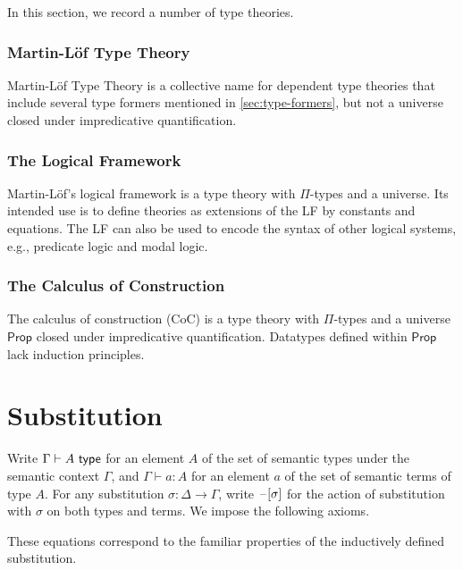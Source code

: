 \documentclass{amsart}
\begin{document}
In this section, we record a number of type theories.

\subsubsection{Martin-L\"{o}f Type Theory}
\label{sec:martin-lof-type-theory}

Martin-L\"{o}f Type Theory is a collective name for dependent type theories that include several type formers mentioned in \cref{sec:type-formers}, but not a universe closed under impredicative quantification.

\subsubsection{The Logical Framework}
\label{sec:logical-framework}

Martin-L\"{o}f's logical framework is a type theory with $\Pi$-types and a universe.
Its intended use is to define theories as extensions of the LF by constants and equations.
The LF can also be used to encode the syntax of other logical systems, e.g., predicate logic and modal logic.

\subsubsection{The Calculus of Construction}
\label{sec:calculus-of-construction}

The calculus of construction (CoC) is a type theory with $\Pi$-types and a universe $\mathsf{Prop}$ closed under impredicative quantification.
Datatypes defined within $\mathsf{Prop}$ lack induction principles.

\section{Substitution}
\label{sec:substitution}
Write $\Gamma \vdash A ~\mathsf{type}$ for an element $A$ of the set of semantic types under the semantic context $\Gamma$, and $\Gamma \vdash a : A$ for an element $a$ of the set of semantic terms of type $A$.
For any substitution $\sigma : \Delta \to \Gamma$, write $\mathord{\hspace{1pt}\text{--}\hspace{1pt}}[\sigma]$ for the action of substitution with $\sigma$ on both types and terms.
We impose the following axioms.
These equations correspond to the familiar properties of the inductively defined substitution.
\end{document}
